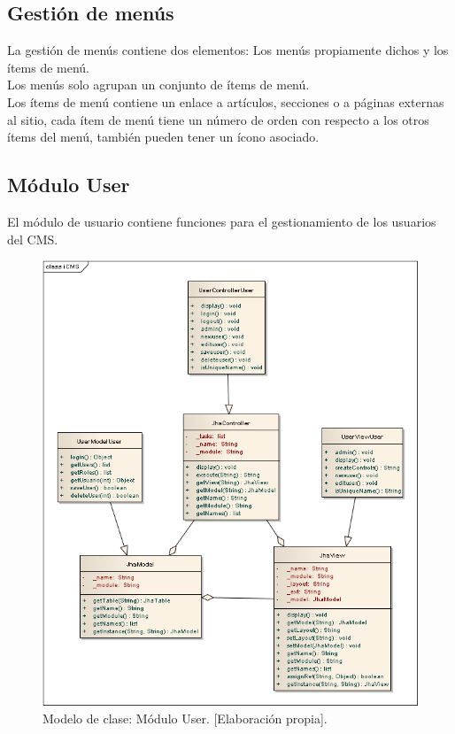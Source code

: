 \subsection{Gesti\'on de men\'us}
La gesti\'on de men\'us contiene dos elementos: Los men\'us propiamente dichos y los \'items de men\'u.\\
Los men\'us solo agrupan un conjunto de \'items de men\'u.\\
Los \'items de men\'u contiene un enlace a art\'iculos, secciones o a p\'aginas externas al sitio, cada \'item de men\'u tiene un n\'umero de orden con respecto a los otros \'items del men\'u, tambi\'en pueden tener un \'icono asociado.

\subsection{M\'odulo User}
El m\'odulo de usuario contiene funciones para el gestionamiento de los usuarios del CMS.

\begin{figure}[h]
\centering
\includegraphics[scale=.4, keepaspectratio=true]{imagenes/16_imagen.png}
\caption{Modelo de clase: M\'odulo User. [Elaboraci\'on propia].}
\end{figure}

